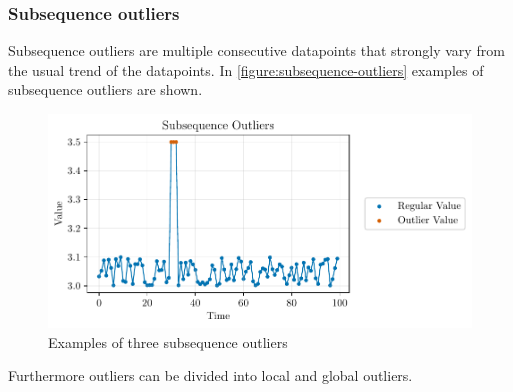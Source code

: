 \subsubsection{Subsequence outliers}
Subsequence outliers are multiple consecutive datapoints that strongly vary from the usual trend of the datapoints. \cite{blazquez-garciaReviewOutlierAnomaly2020} In \autoref{figure:subsequence-outliers} examples of subsequence outliers are shown.
\newline\newline
\begin{figure}[h]
  \centering
  \includegraphics{./plots/pdfs/subsequence_outliers.pdf}
  \caption{Examples of three subsequence outliers}
  \label{figure:subsequence-outliers}
\end{figure}
Furthermore outliers can be divided into local and global outliers. 

